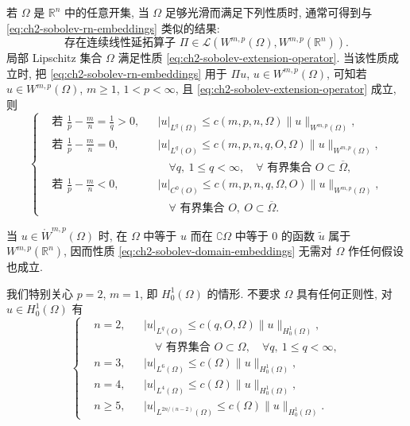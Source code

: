 若 $\Omega$ 是 $\mathbb R^n$ 中的任意开集, 当 $\Omega$ 足够光滑而满足下列性质时, 通常可得到与 \eqref{eq:ch2-sobolev-rn-embeddings} 类似的结果:
\begin{equation}
\text{存在连续线性延拓算子 }
\Pi\in\mathcal L(W^{m,p}(\Omega),W^{m,p}(\mathbb R^n)).
\label{eq:ch2-sobolev-extension-operator}
\end{equation}
局部 Lipschitz 集合 $\Omega$ 满足性质 \eqref{eq:ch2-sobolev-extension-operator}. 当该性质成立时, 把 \eqref{eq:ch2-sobolev-rn-embeddings} 用于 $\Pi u$, $u\in W^{m,p}(\Omega)$, 可知若 $u\in W^{m,p}(\Omega)$, $m\geq1$, $1<p<\infty$, 且 \eqref{eq:ch2-sobolev-extension-operator} 成立, 则
\begin{equation}
\left\{
\begin{aligned}
&\text{若 }\frac1p-\frac mn=\frac1q>0,
&&\lvert u\rvert_{L^q(\Omega)}
\leq c(m,p,n,\Omega)\lVert u\rVert_{W^{m,p}(\Omega)},\\
&\text{若 }\frac1p-\frac mn=0,
&&\lvert u\rvert_{L^q(O)}
\leq c(m,p,n,q,O,\Omega)\lVert u\rVert_{W^{m,p}(\Omega)},\\
&&&\quad\forall q,\ 1\leq q<\infty,
\quad\forall\text{ 有界集合 }O\subset\overline\Omega,\\
&\text{若 }\frac1p-\frac mn<0,
&&\lvert u\rvert_{C^0(O)}
\leq c(m,p,n,q,\Omega,O)\lVert u\rVert_{W^{m,p}(\Omega)},\\
&&&\quad\forall\text{ 有界集合 }O,\ O\subset\overline\Omega.
\end{aligned}
\right.
\label{eq:ch2-sobolev-domain-embeddings}
\end{equation}

\hypertarget{chapter-02-page-122}{}
当 $u\in\mathring W^{m,p}(\Omega)$ 时, 在 $\Omega$ 中等于 $u$ 而在 $\complement\Omega$ 中等于 $0$ 的函数 $\widetilde u$ 属于 $W^{m,p}(\mathbb R^n)$, 因而性质 \eqref{eq:ch2-sobolev-domain-embeddings} 无需对 $\Omega$ 作任何假设也成立.

我们特别关心 $p=2$, $m=1$, 即 $H_0^1(\Omega)$ 的情形. 不要求 $\Omega$ 具有任何正则性, 对 $u\in H_0^1(\Omega)$ 有
\begin{equation}
\left\{
\begin{aligned}
&n=2,
&&\lvert u\rvert_{L^q(O)}\leq c(q,O,\Omega)\lVert u\rVert_{H_0^1(\Omega)},\\
&&&\quad\forall\text{ 有界集合 }O\subset\Omega,
\quad\forall q,\ 1\leq q<\infty,\\
&n=3,
&&\lvert u\rvert_{L^6(\Omega)}\leq c(\Omega)\lVert u\rVert_{H_0^1(\Omega)},\\
&n=4,
&&\lvert u\rvert_{L^4(\Omega)}\leq c(\Omega)\lVert u\rVert_{H_0^1(\Omega)},\\
&n\geq5,
&&\lvert u\rvert_{L^{2n/(n-2)}(\Omega)}
\leq c(\Omega)\lVert u\rVert_{H_0^1(\Omega)}.
\end{aligned}
\right.
\label{eq:ch2-h01-sobolev-embeddings}
\end{equation}

